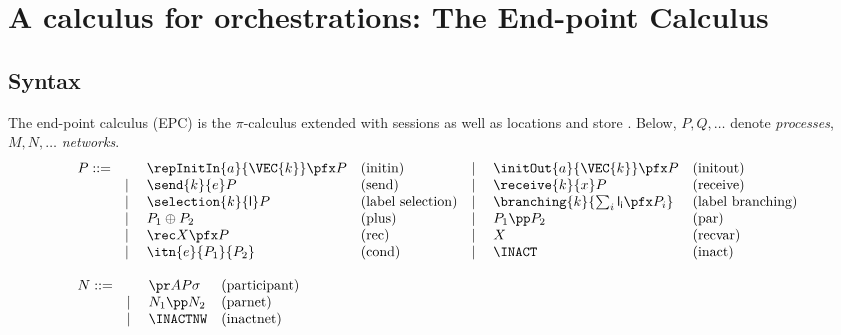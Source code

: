 \section{A calculus for orchestrations: The End-point Calculus }
\label{Logic4Struct:sec:epc}

\subsection{Syntax}
The end-point calculus (EPC) \cite{carbone7scc} is the $\pi$-calculus
\cite{milner:99:cmspc} extended with sessions \cite{honda1998lpa} as
well as locations \cite{hennessy2007distributed} and store
\cite{DBLP:conf/fsttcs/CarboneNS04}.  Below, $P, Q, \ldots$ denote {\em processes}, $M,
N, \ldots$ {\em networks}.
\[\label{Logic4Struct:endpointsyntaxlable}
\begin{array}{ll}
\begin{array}{rllll}
  P ::=
  &\phantom{{}\mid\quad}  \repInitIn {a}{\VEC{k}}\pfx P & \text{(initin)} 
  &\mid \quad \initOut{a}{\VEC{k}}\pfx P                  & \text{(initout)}\\
  &\mid\quad \send{k}{e} P                    &\text{(send)} 
  &\mid\quad \receive{k}{x} P                &\text{(receive)}\\
  &\mid\quad \selection{k}{\mathsf{l}} P  &\text{(label selection)} 
  &\mid\quad \branching{k}{\sum_i \mathsf{l_i} \pfx P_i}  &\text{(label branching)}\\
  &\mid \quad P_1\oplus P_2                              & \text{(plus)}    
  &\mid\quad  P_1\pp P_2                                 &
  \text{(par)}\\  
  &\mid \quad \rec X\pfx P                              & \text{(rec)}   
  &\mid\quad  X                                         & \text{(recvar)}\\
 &\mid\quad\itn{e}{P_1}{P_2}                     & \text{(cond)} 
  &\mid\quad  \INACT                                    & \text{(inact)}\\
\end{array}
\\\\ 

\begin{array}{rll}
  N
  ::=
  &\phantom{{}\mid\quad}   \pr AP\sigma
  &\text{(participant)}\\
  &\mid\quad  N_1\pp N_2 &\text{(parnet)}\\
  &\mid\quad  \INACTNW  &\text{(inactnet)}
\end{array}
\end{array}
\]
